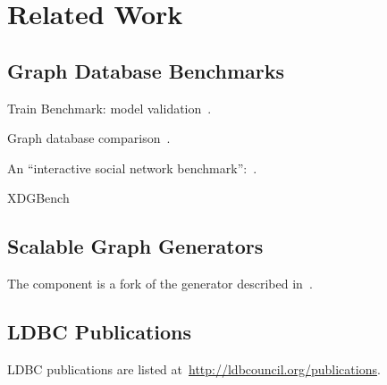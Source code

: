 \chapter{Related Work}
\label{section:related-work}


\section{Graph Database Benchmarks}

Train Benchmark: model validation~\cite{TrainBenchmarkSOSYM}.

Graph database comparison~\cite{lissandrini17}.

An ``interactive social network benchmark'':~\cite{DBLP:conf/cidr/BarahmandG13}.

XDGBench~\cite{DBLP:journals/ase/DayarathnaS14}


\section{Scalable Graph Generators}

The \datagen component is a fork of the generator described in~\cite{DBLP:conf/tpctc/PhamBE12}.


\section{LDBC Publications}

LDBC publications are listed at~\url{http://ldbcouncil.org/publications}.